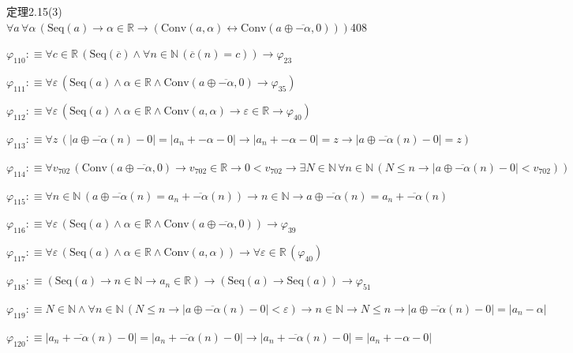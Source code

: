 \begin{fullproof}{定理2.15(3)}{$\forall a\,\forall \alpha\,(\mathrm{Seq}(a) \to \alpha \in \mathbb{R} \to (\mathrm{Conv}(a,\alpha) \leftrightarrow \mathrm{Conv}(a \oplus \overline{-\alpha},0)))$}{408}
\begin{abbrevlist}
\item $\varphi_{110} :\equiv \forall c \in \mathbb{R}\,(\mathrm{Seq}(\overline{c}) \land \forall n \in \mathbb{N}\,(\overline{c}(n) = c)) \to \varphi_{23}$
\item $\varphi_{111} :\equiv \forall \varepsilon\,(\mathrm{Seq}(a) \land \alpha \in \mathbb{R} \land \mathrm{Conv}(a \oplus \overline{-\alpha},0) \to \varphi_{35})$
\item $\varphi_{112} :\equiv \forall \varepsilon\,(\mathrm{Seq}(a) \land \alpha \in \mathbb{R} \land \mathrm{Conv}(a,\alpha) \to \varepsilon \in \mathbb{R} \to \varphi_{40})$
\item $\varphi_{113} :\equiv \forall z\,(\lvert a \oplus \overline{-\alpha}(n) - 0 \rvert = \lvert a_{n} + -\alpha - 0 \rvert \to \lvert a_{n} + -\alpha - 0 \rvert = z \to \lvert a \oplus \overline{-\alpha}(n) - 0 \rvert = z)$
\item $\varphi_{114} :\equiv \forall v_{702}\,(\mathrm{Conv}(a \oplus \overline{-\alpha},0) \to v_{702} \in \mathbb{R} \to 0 < v_{702} \to \exists N \in \mathbb{N}\,\forall n \in \mathbb{N}\,(N \leq n \to \lvert a \oplus \overline{-\alpha}(n) - 0 \rvert < v_{702}))$
\item $\varphi_{115} :\equiv \forall n \in \mathbb{N}\,(a \oplus \overline{-\alpha}(n) = a_{n} + \overline{-\alpha}(n)) \to n \in \mathbb{N} \to a \oplus \overline{-\alpha}(n) = a_{n} + \overline{-\alpha}(n)$
\item $\varphi_{116} :\equiv \forall \varepsilon\,(\mathrm{Seq}(a) \land \alpha \in \mathbb{R} \land \mathrm{Conv}(a \oplus \overline{-\alpha},0)) \to \varphi_{39}$
\item $\varphi_{117} :\equiv \forall \varepsilon\,(\mathrm{Seq}(a) \land \alpha \in \mathbb{R} \land \mathrm{Conv}(a,\alpha)) \to \forall \varepsilon \in \mathbb{R}\,(\varphi_{40})$
\item $\varphi_{118} :\equiv (\mathrm{Seq}(a) \to n \in \mathbb{N} \to a_{n} \in \mathbb{R}) \to (\mathrm{Seq}(a) \to \mathrm{Seq}(a)) \to \varphi_{51}$
\item $\varphi_{119} :\equiv N \in \mathbb{N} \land \forall n \in \mathbb{N}\,(N \leq n \to \lvert a \oplus \overline{-\alpha}(n) - 0 \rvert < \varepsilon) \to n \in \mathbb{N} \to N \leq n \to \lvert a \oplus \overline{-\alpha}(n) - 0 \rvert = \lvert a_{n} - \alpha \rvert$
\item $\varphi_{120} :\equiv \lvert a_{n} + \overline{-\alpha}(n) - 0 \rvert = \lvert a_{n} + \overline{-\alpha}(n) - 0 \rvert \to \lvert a_{n} + \overline{-\alpha}(n) - 0 \rvert = \lvert a_{n} + -\alpha - 0 \rvert$

\end{abbrevlist}
\end{fullproof}
